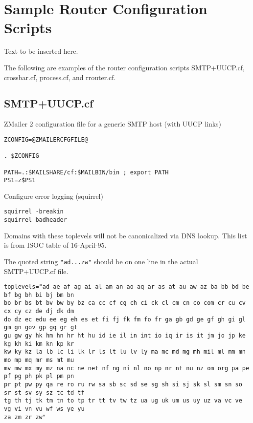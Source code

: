 \section{Sample Router Configuration Scripts}

Text to be inserted here.

The following are examples of the router configuration scripts SMTP+UUCP.cf, crossbar.cf, process.cf, and rrouter.cf.




\subsection{SMTP+UUCP.cf}

ZMailer 2 configuration file for a generic SMTP host (with UUCP links)

\begin{tscreen}
\begin{verbatim}
ZCONFIG=@ZMAILERCFGFILE@

. $ZCONFIG

PATH=.:$MAILSHARE/cf:$MAILBIN/bin ; export PATH
PS1=z$PS1
\end{verbatim}
\end{tscreen}


Configure error logging (squirrel)

\begin{tscreen}
\begin{verbatim}
squirrel -breakin
squirrel badheader
\end{verbatim}
\end{tscreen}


Domains with these toplevels will not be canonicalized via DNS lookup.
This list is from ISOC table of 16-April-95.

The quoted string {\tt "ad...zw"} should be on one line in the actual SMTP+UUCP.cf file.

\begin{tscreen}
\begin{verbatim}
toplevels="ad ae af ag ai al am an ao aq ar as at au aw az ba bb bd be bf bg bh bi bj bm bn 
bo br bs bt bv bw by bz ca cc cf cg ch ci ck cl cm cn co com cr cu cv cx cy cz de dj dk dm 
do dz ec edu ee eg eh es et fi fj fk fm fo fr ga gb gd ge gf gh gi gl gm gn gov gp gq gr gt 
gu gw gy hk hm hn hr ht hu id ie il in int io iq ir is it jm jo jp ke kg kh ki km kn kp kr 
kw ky kz la lb lc li lk lr ls lt lu lv ly ma mc md mg mh mil ml mm mn mo mp mq mr ms mt mu 
mv mw mx my mz na nc ne net nf ng ni nl no np nr nt nu nz om org pa pe pf pg ph pk pl pm pn 
pr pt pw py qa re ro ru rw sa sb sc sd se sg sh si sj sk sl sm sn so sr st sv sy sz tc td tf 
tg th tj tk tm tn to tp tr tt tv tw tz ua ug uk um us uy uz va vc ve vg vi vn vu wf ws ye yu 
za zm zr zw"
\end{verbatim}
\end{tscreen}


